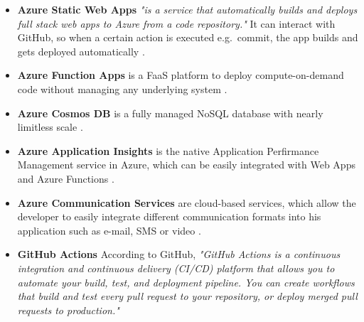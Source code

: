 \begin{itemize}
	\item \textbf{Azure Static Web Apps} \emph{"is a service that automatically builds and deploys full stack web apps to Azure from a code repository."} It can interact with GitHub, so when a certain action is executed e.g.\ commit, the app builds and gets deployed automatically \cite{StaticWebApps}.
	
	\item \textbf{Azure Function Apps} is a FaaS platform to deploy compute-on-demand code without managing any underlying system \cite{ArchExample1}.
	
	\item \textbf{Azure Cosmos DB} is a fully managed NoSQL database with nearly limitless scale \cite{ArchExample1}.
	
	\item \textbf{Azure Application Insights} is the native Application Perfirmance Management service in Azure, which can be easily integrated with Web Apps and Azure Functions \cite{ArchExample1}.
	
	\item \textbf{Azure Communication Services} are cloud-based services, which allow the developer to easily integrate different communication formats into his application such as e-mail, SMS or video \cite{CommunicationServices}.
	
	\item \textbf{GitHub Actions} According to GitHub, \emph{"GitHub Actions is a continuous integration and continuous delivery (CI/CD) platform that allows you to automate your build, test, and deployment pipeline. You can create workflows that build and test every pull request to your repository, or deploy merged pull requests to production."} \cite{GitHubActions}
	
\end{itemize}





